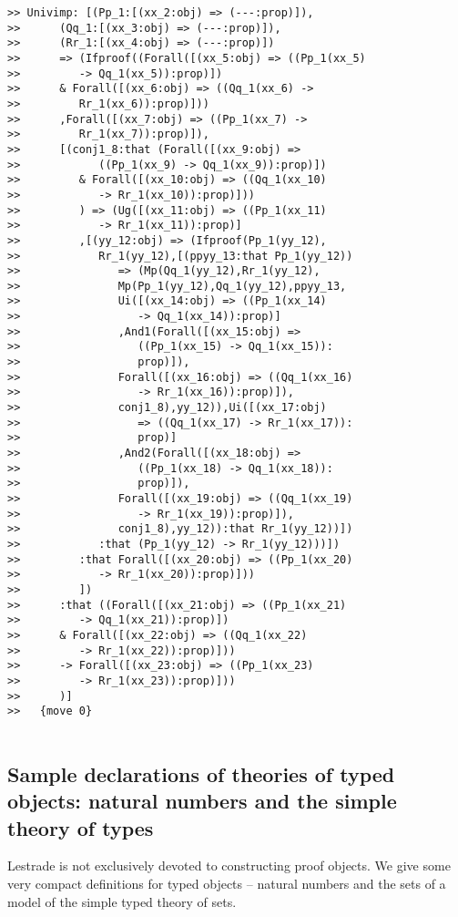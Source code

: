 \documentclass[12pt]{article}
\begin{document}
\begin{verbatim}
>> Univimp: [(Pp_1:[(xx_2:obj) => (---:prop)]),
>>      (Qq_1:[(xx_3:obj) => (---:prop)]),
>>      (Rr_1:[(xx_4:obj) => (---:prop)])
>>      => (Ifproof((Forall([(xx_5:obj) => ((Pp_1(xx_5)
>>         -> Qq_1(xx_5)):prop)])
>>      & Forall([(xx_6:obj) => ((Qq_1(xx_6) ->
>>         Rr_1(xx_6)):prop)]))
>>      ,Forall([(xx_7:obj) => ((Pp_1(xx_7) ->
>>         Rr_1(xx_7)):prop)]),
>>      [(conj1_8:that (Forall([(xx_9:obj) =>
>>            ((Pp_1(xx_9) -> Qq_1(xx_9)):prop)])
>>         & Forall([(xx_10:obj) => ((Qq_1(xx_10)
>>            -> Rr_1(xx_10)):prop)]))
>>         ) => (Ug([(xx_11:obj) => ((Pp_1(xx_11)
>>            -> Rr_1(xx_11)):prop)]
>>         ,[(yy_12:obj) => (Ifproof(Pp_1(yy_12),
>>            Rr_1(yy_12),[(ppyy_13:that Pp_1(yy_12))
>>               => (Mp(Qq_1(yy_12),Rr_1(yy_12),
>>               Mp(Pp_1(yy_12),Qq_1(yy_12),ppyy_13,
>>               Ui([(xx_14:obj) => ((Pp_1(xx_14)
>>                  -> Qq_1(xx_14)):prop)]
>>               ,And1(Forall([(xx_15:obj) =>
>>                  ((Pp_1(xx_15) -> Qq_1(xx_15)):
>>                  prop)]),
>>               Forall([(xx_16:obj) => ((Qq_1(xx_16)
>>                  -> Rr_1(xx_16)):prop)]),
>>               conj1_8),yy_12)),Ui([(xx_17:obj)
>>                  => ((Qq_1(xx_17) -> Rr_1(xx_17)):
>>                  prop)]
>>               ,And2(Forall([(xx_18:obj) =>
>>                  ((Pp_1(xx_18) -> Qq_1(xx_18)):
>>                  prop)]),
>>               Forall([(xx_19:obj) => ((Qq_1(xx_19)
>>                  -> Rr_1(xx_19)):prop)]),
>>               conj1_8),yy_12)):that Rr_1(yy_12))])
>>            :that (Pp_1(yy_12) -> Rr_1(yy_12)))])
>>         :that Forall([(xx_20:obj) => ((Pp_1(xx_20)
>>            -> Rr_1(xx_20)):prop)]))
>>         ])
>>      :that ((Forall([(xx_21:obj) => ((Pp_1(xx_21)
>>         -> Qq_1(xx_21)):prop)])
>>      & Forall([(xx_22:obj) => ((Qq_1(xx_22)
>>         -> Rr_1(xx_22)):prop)]))
>>      -> Forall([(xx_23:obj) => ((Pp_1(xx_23)
>>         -> Rr_1(xx_23)):prop)]))
>>      )]
>>   {move 0}


\end{verbatim}

\subsection{Sample declarations of theories of typed objects:  natural numbers and the simple theory of types}

Lestrade is not exclusively devoted to constructing proof objects.  We give some very compact definitions for typed objects -- natural numbers and the sets of a model of the simple typed theory of sets.
\end{document}
